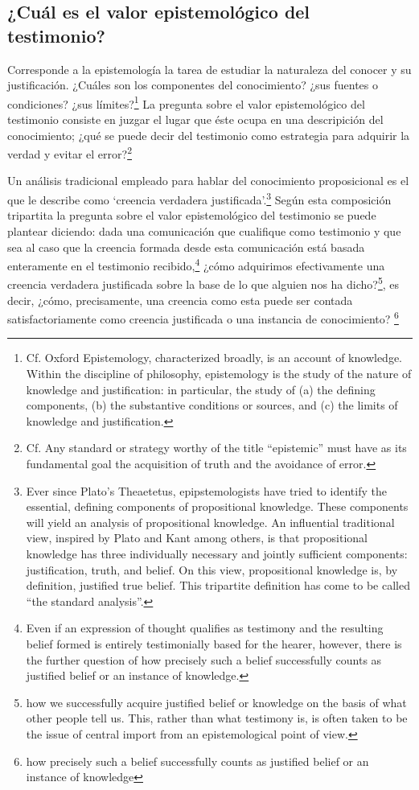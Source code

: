 \subsection{¿Cuál es el valor epistemológico del testimonio?}
Corresponde a la epistemología la tarea de estudiar la naturaleza del conocer y
su justificación. ¿Cuáles son los componentes del conocimiento? ¿sus fuentes o
condiciones? ¿sus límites?\footnote{Cf. Oxford Epistemology, characterized
  broadly, is an account of knowledge. Within the discipline of philosophy,
  epistemology is the study of the nature of knowledge and justification: in
  particular, the study of (a) the defining components, (b) the substantive
  conditions or sources, and (c) the limits of knowledge and justification.} La
pregunta sobre el valor epistemológico del testimonio consiste en juzgar el
lugar que éste ocupa en una descripición del conocimiento; ¿qué se puede decir
del testimonio como estrategia para adquirir la verdad y evitar el
error?\footnote{Cf. Any standard or strategy worthy of the title ``epistemic''
  must have as its fundamental goal the acquisition of truth and the avoidance
  of error.}

Un análisis tradicional empleado para hablar del conocimiento proposicional es
el que le describe como `creencia verdadera justificada'.\footnote{Ever since
  Plato's Theaetetus, epipstemologists have tried to identify the essential,
  defining components of propositional knowledge. These components will yield an
  analysis of propositional knowledge. An influential traditional view, inspired
  by Plato and Kant among others, is that propositional knowledge has three
  individually necessary and jointly sufficient components: justification,
  truth, and belief. On this view, propositional knowledge is, by definition,
  justified true belief. This tripartite definition has come to be called ``the
  standard analysis''.} Según esta composición tripartita la pregunta sobre el
valor epistemológico del testimonio se puede plantear diciendo: dada una
comunicación que cualifique como testimonio y que sea al caso que la creencia
formada desde esta comunicación está basada enteramente en el testimonio
recibido,\footnote{Even if an expression of thought qualifies as testimony and
  the resulting belief formed is entirely testimonially based for the hearer,
  however, there is the further question of how precisely such a belief
  successfully counts as justified belief or an instance of knowledge.} ¿cómo
adquirimos efectivamente una creencia verdadera justificada sobre la base de lo
que alguien nos ha dicho?\footnote{how we successfully acquire justified belief
  or knowledge on the basis of what other people tell us. This, rather than what
  testimony is, is often taken to be the issue of central import from an
  epistemological point of view.}, es decir, ¿cómo, precisamente, una creencia
como esta puede ser contada satisfactoriamente como creencia justificada o una
instancia de conocimiento? \footnote{how precisely such a belief successfully
  counts as justified belief or an instance of knowledge}


